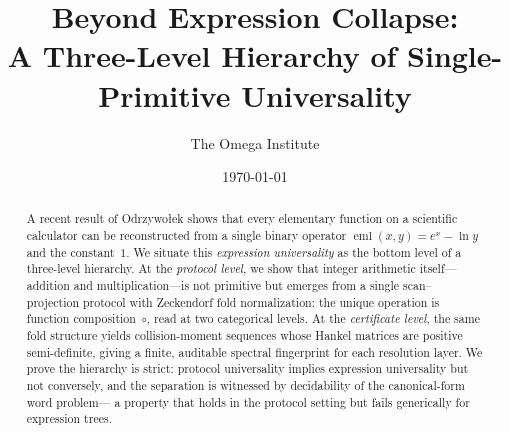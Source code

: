 \documentclass[11pt,a4paper]{amsart}
\title{Beyond Expression Collapse:\\
  A Three-Level Hierarchy of Single-Primitive Universality}
\author{The Omega Institute}
\date{\today}
\theoremstyle{plain}
\theoremstyle{definition}
\DeclareMathOperator{\eml}{eml}
\begin{document}
\begin{abstract}
A recent result of Odrzywołek shows that every elementary function
on a scientific calculator can be reconstructed from a single binary
operator $\eml(x,y)=e^{x}-\ln y$ and the constant~$1$.
We situate this \emph{expression universality} as the bottom level
of a three-level hierarchy.
At the \emph{protocol level}, we show that integer arithmetic
itself---addition and multiplication---is not primitive but emerges
from a single scan--projection protocol with Zeckendorf fold
normalization: the unique operation is function composition~$\circ$,
read at two categorical levels.
At the \emph{certificate level}, the same fold structure yields
collision-moment sequences whose Hankel matrices are positive
semi-definite, giving a finite, auditable spectral fingerprint for
each resolution layer.
We prove the hierarchy is strict: protocol universality implies
expression universality but not conversely, and the separation
is witnessed by decidability of the canonical-form word problem---
a property that holds in the protocol setting but fails generically
for expression trees.
\end{abstract}

\maketitle
\tableofcontents









\printbibliography
\end{document}
